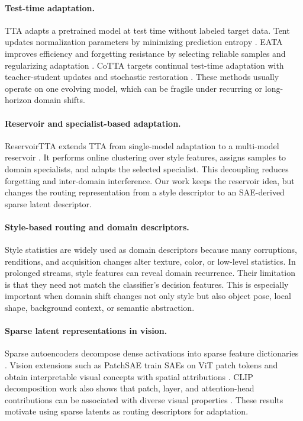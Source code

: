 \documentclass{article}
\begin{document}
\paragraph{Test-time adaptation.}
TTA adapts a pretrained model at test time without labeled target data. Tent updates normalization parameters by minimizing prediction entropy \cite{wang2021tent}. EATA improves efficiency and forgetting resistance by selecting reliable samples and regularizing adaptation \cite{niu2022eata}. CoTTA targets continual test-time adaptation with teacher-student updates and stochastic restoration \cite{wang2022cotta}. These methods usually operate on one evolving model, which can be fragile under recurring or long-horizon domain shifts.

\paragraph{Reservoir and specialist-based adaptation.}
ReservoirTTA extends TTA from single-model adaptation to a multi-model reservoir \cite{vray2025reservoirtta}. It performs online clustering over style features, assigns samples to domain specialists, and adapts the selected specialist. This decoupling reduces forgetting and inter-domain interference. Our work keeps the reservoir idea, but changes the routing representation from a style descriptor to an SAE-derived sparse latent descriptor.

\paragraph{Style-based routing and domain descriptors.}
Style statistics are widely used as domain descriptors because many corruptions, renditions, and acquisition changes alter texture, color, or low-level statistics. In prolonged streams, style features can reveal domain recurrence. Their limitation is that they need not match the classifier's decision features. This is especially important when domain shift changes not only style but also object pose, local shape, background context, or semantic abstraction.

\paragraph{Sparse latent representations in vision.}
Sparse autoencoders decompose dense activations into sparse feature dictionaries \cite{bricken2023monosemanticity,gao2024scaling}. Vision extensions such as PatchSAE train SAEs on ViT patch tokens and obtain interpretable visual concepts with spatial attributions \cite{lim2025patchsae}. CLIP decomposition work also shows that patch, layer, and attention-head contributions can be associated with diverse visual properties \cite{gandelsman2024clipdecomposition}. These results motivate using sparse latents as routing descriptors for adaptation.
\end{document}
